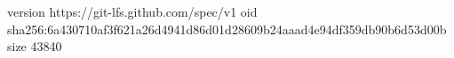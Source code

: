 version https://git-lfs.github.com/spec/v1
oid sha256:6a430710af3f621a26d4941d86d01d28609b24aaad4e94df359db90b6d53d00b
size 43840
